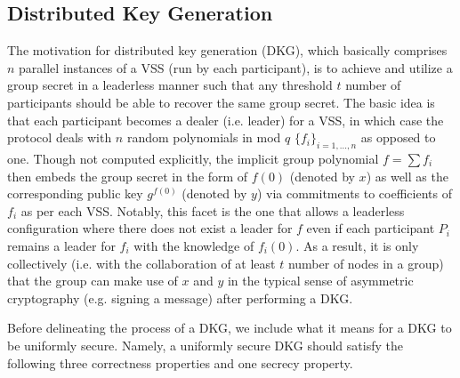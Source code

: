 \documentclass[11pt]{article}
\theoremstyle{definition}
\theoremstyle{remark}
\begin{document}

\subsection{Distributed Key Generation}
The motivation for distributed key generation (DKG), which basically comprises $n$ parallel instances of a VSS (run by each participant), is to achieve and utilize a group secret in a leaderless manner such that any threshold $t$ number of participants should be able to recover the same group secret. The basic idea is that each participant becomes a dealer (i.e. leader) for a VSS, in which case the protocol deals with $n$ random polynomials in mod $q$ $\{f_i\}_{i = 1, ..., n}$ as opposed to one. Though not computed explicitly, the implicit group polynomial $f = \sum f_i$ then embeds the group secret in the form of $f(0)$ (denoted by $x$) as well as the corresponding public key $g^{f(0)}$ (denoted by $y$) via commitments to coefficients of $f_i$ as per each VSS. Notably, this facet is the one that allows a leaderless configuration where there does not exist a leader for $f$ even if each participant $P_i$ remains a leader for $f_i$ with the knowledge of $f_i(0)$. As a result, it is only collectively (i.e. with the collaboration of at least $t$ number of nodes in a group) that the group can make use of $x$ and $y$ in the typical sense of asymmetric cryptography (e.g. signing a message) after performing a DKG.

Before delineating the process of a DKG, we include what it means for a DKG to be uniformly secure. Namely, a uniformly secure DKG should satisfy the following three correctness properties and one secrecy property.
\end{document}
